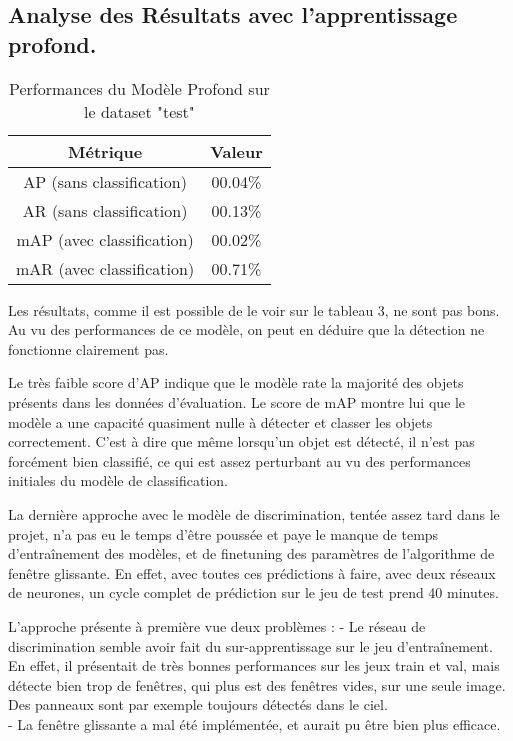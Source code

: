 \documentclass[twocolumn,10pt]{article}
\begin{document}
    \subsection{Analyse des Résultats avec l'apprentissage profond.}

    \begin{table}[h!]
        \centering
        \begin{tabular}{|c|c|}
            \hline
            \textbf{Métrique} & \textbf{Valeur} \\ \hline
            AP (sans classification) & 00.04\%	 \\ \hline
            AR (sans classification) & 00.13\% \\ \hline
            mAP (avec classification) & 00.02\% \\ \hline
            mAR (avec classification) & 00.71\%	 \\ \hline
        \end{tabular}
        \caption{Performances du Modèle Profond sur le dataset "test"}
        \label{tab:performances3}
    \end{table}

    Les résultats, comme il est possible de le voir sur le tableau 3, ne sont pas bons. Au vu des performances de ce modèle, on peut en déduire que la détection ne fonctionne clairement pas.

    Le très faible score d'AP indique que le modèle rate la majorité des objets présents dans les données d'évaluation. Le score de mAP montre lui que le modèle a une capacité quasiment nulle à détecter et classer les objets correctement. C'est à dire que même lorsqu'un objet est détecté, il n'est pas forcément bien classifié, ce qui est assez perturbant au vu des performances initiales du modèle de classification.

    La dernière approche avec le modèle de discrimination, tentée assez tard dans le projet, n'a pas eu le temps d'être poussée et paye le manque de temps d'entraînement des modèles, et de finetuning des paramètres de l'algorithme de fenêtre glissante. En effet, avec toutes ces prédictions à faire, avec deux réseaux de neurones, un cycle complet de prédiction sur le jeu de test prend 40 minutes.

    L'approche présente à première vue deux problèmes :
    - Le réseau de discrimination semble avoir fait du sur-apprentissage sur le jeu d'entraînement. En effet, il présentait de très bonnes performances sur les jeux train et val, mais détecte bien trop de fenêtres, qui plus est des fenêtres vides, sur une seule image. Des panneaux sont par exemple toujours détectés dans le ciel. \\
    - La fenêtre glissante a mal été implémentée, et aurait pu être bien plus efficace.
\end{document}
